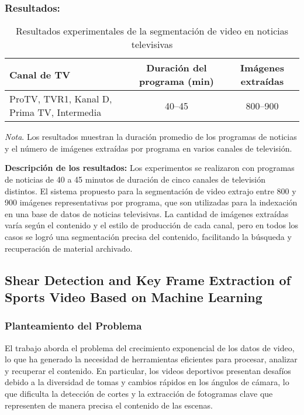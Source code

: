 \subsubsection{Resultados: }

\begin{table}[h]
    \centering
    \caption{Resultados experimentales de la segmentación de video en noticias televisivas}
    \begin{tabular}{lcc}
        \hline
        \textbf{Canal de TV} & \textbf{Duración del programa (min)} & \textbf{Imágenes extraídas} \\
        \hline
        ProTV, TVR1, Kanal D, Prima TV, Intermedia & 40--45 & 800--900 \\
        \hline
    \end{tabular}
    \label{tab:segmentacion}
    \begin{flushleft}
    \textit{Nota}. Los resultados muestran la duración promedio de los programas de noticias y el número de imágenes extraídas por programa en varios canales de televisión.
    \end{flushleft}
\end{table}


\noindent \textbf{Descripción de los resultados:} Los experimentos se realizaron con programas de noticias de 40 a 45 minutos de duración de cinco canales de televisión distintos. El sistema propuesto para la segmentación de video extrajo entre 800 y 900 imágenes representativas por programa, que son utilizadas para la indexación en una base de datos de noticias televisivas. La cantidad de imágenes extraídas varía según el contenido y el estilo de producción de cada canal, pero en todos los casos se logró una segmentación precisa del contenido, facilitando la búsqueda y recuperación de material archivado.


\subsection{Shear Detection and Key Frame Extraction of Sports Video Based on Machine Learning}
\cite{wang2023shear}
\subsubsection{Planteamiento del Problema}

El trabajo aborda el problema del crecimiento exponencial de los datos de video, lo que ha generado la necesidad de herramientas eficientes para procesar, analizar y recuperar el contenido. En particular, los videos deportivos presentan desafíos debido a la diversidad de tomas y cambios rápidos en los ángulos de cámara, lo que dificulta la detección de cortes y la extracción de fotogramas clave que representen de manera precisa el contenido de las escenas.

